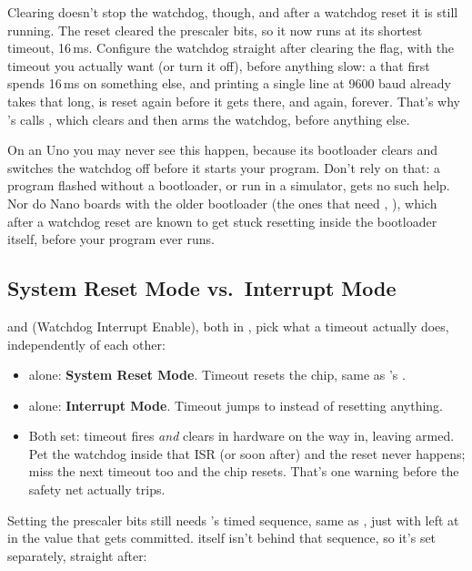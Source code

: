 Clearing  doesn't stop the watchdog, though, and after a watchdog reset it is still
running. The reset cleared the prescaler bits, so it now runs at its shortest timeout, 16\,ms.
Configure the watchdog straight after clearing the flag, with the timeout you actually want (or turn
it off), before anything slow: a  that first spends 16\,ms on something else, and
printing a single line at 9600 baud already takes that long, is reset again before it gets there,
and again, forever. That's why 's  calls , which
clears  and then arms the watchdog, before anything else.

On an Uno you may never see this happen, because its bootloader clears  and switches
the watchdog off before it starts your program. Don't rely on that: a program flashed without a
bootloader, or run in a simulator, gets no such help. Nor do Nano boards with the older bootloader
(the ones that need , ), which after a watchdog reset are known to get
stuck resetting inside the bootloader itself, before your program ever runs.

\subsection{System Reset Mode vs.\ Interrupt Mode}
\label{c8:a:4}
 and  (Watchdog Interrupt Enable), both in , pick what a timeout
actually does, independently of each other:
\begin{itemize}
  \item {} alone: \textbf{System Reset Mode}. Timeout resets the chip, same as
    's .
  \item {} alone: \textbf{Interrupt Mode}. Timeout jumps to  instead
    of resetting anything.
  \item Both set: timeout fires  \emph{and} clears  in hardware on
    the way in, leaving  armed. Pet the watchdog inside that ISR (or soon after) and the
    reset never happens; miss the next timeout too and the chip resets. That's one warning before
    the safety net actually trips.
\end{itemize}
Setting the prescaler bits still needs 's  timed sequence, same as
, just with  left at  in the value that gets committed.
 itself isn't behind that sequence, so it's set separately, straight after:

